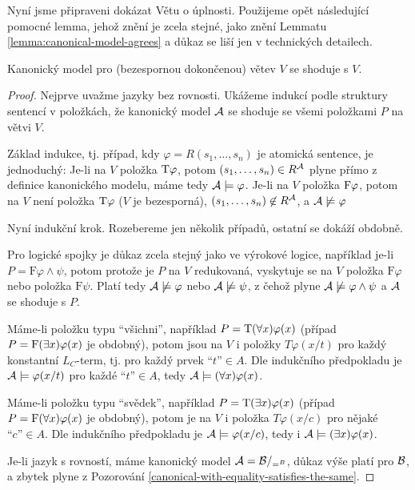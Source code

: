 Nyní jsme připraveni dokázat Větu o úplnosti. Použijeme opět následující pomocné lemma, jehož znění je zcela stejné, jako znění Lemmatu \ref{lemma:canonical-model-agrees} a důkaz se liší jen v technických detailech.

\begin{lemma}\label{lemma:canonical-model-agrees-predicate}
    Kanonický model pro (bezespornou dokončenou) větev $V$ se shoduje s $V$.
\end{lemma}
\begin{proof}
Nejprve uvažme jazyky bez rovnosti. Ukážeme indukcí podle struktury sentencí v položkách, že kanonický model $\mathcal{A}$ se shoduje se všemi položkami $P$ na větvi $V$. 

Základ indukce, tj. případ, kdy $\varphi=R(s_1,\dots,s_n)$ je atomická sentence, je jednoduchý: Je-li na $V$ položka $\mathrm{T}\varphi$, potom $(s_1,\dots,s_n)\in R^{\mathcal{A}}$ plyne přímo z definice kanonického modelu, máme tedy $\mathcal{A}\models\varphi$.  Je-li na $V$ položka $\mathrm{F}\varphi$, potom na $V$ není položka $\mathrm{T}\varphi$ ($V$ je bezesporná), $(s_1,\dots,s_n)\not\in R^{\mathcal{A}}$, a $\mathcal{A}\not\models\varphi$

Nyní indukční krok. Rozebereme jen několik případů, ostatní se dokáží obdobně. 

Pro logické spojky je důkaz zcela stejný jako ve výrokové logice, například je-li $P=\mathrm{F}\varphi\land\psi$, potom protože je $P$ na $V$ redukovaná, vyskytuje se na $V$ položka $\mathrm{F}\varphi$ nebo položka $\mathrm{F}\psi$. Platí tedy $\mathcal{A}\not\models\varphi$ nebo $\mathcal{A}\not\models\psi$, z čehož plyne $\mathcal{A}\not\models\varphi\land\psi$ a $\mathcal{A}$ se shoduje s $P$.

Máme-li položku typu ``všichni'', například $P=\mathrm{T}(\forall x)\varphi(x)$ 
(případ $P=\mathrm{F}(\exists x)\varphi(x)$ je obdobný), potom jsou na $V$ i položky $T\varphi(x/t)$ pro každý konstantní $L_C$-term, tj. pro každý prvek $\text{``$t$''}\in A$. Dle indukčního předpokladu je $\mathcal{A}\models\varphi(x/t)$ pro každé $\text{``$t$''}\in A$, tedy $\mathcal{A}\models(\forall x)\varphi(x)$.

Máme-li položku typu ``svědek'', například $P=\mathrm{T}(\exists x)\varphi(x)$ 
(případ $P=\mathrm{F}(\forall x)\varphi(x)$ je obdobný), potom je na $V$ i položka $T\varphi(x/c)$ pro nějaké $\text{``$c$''}\in A$. Dle indukčního předpokladu je $\mathcal{A}\models\varphi(x/c)$, tedy i $\mathcal{A}\models(\exists x)\varphi(x)$.

Je-li jazyk s rovností, máme kanonický model $\mathcal{A}=\mathcal{B}/_{=^B}$, důkaz výše platí pro $\mathcal{B}$, a zbytek plyne z Pozorování \ref{canonical-with-equality-satisfies-the-same}.
\end{proof}

